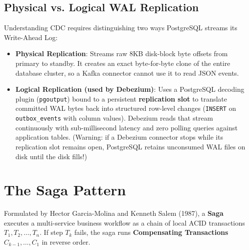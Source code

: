 \subsection{Physical vs. Logical WAL Replication}

Understanding CDC requires distinguishing two ways PostgreSQL streams its Write-Ahead Log:
\begin{itemize}[leftmargin=18pt]
  \item \textbf{Physical Replication}: Streams raw 8KB disk-block byte offsets from primary to standby. It creates an exact byte-for-byte clone of the entire database cluster, so a Kafka connector cannot use it to read JSON events.
  \item \textbf{Logical Replication (used by Debezium)}: Uses a PostgreSQL decoding plugin (\texttt{pgoutput}) bound to a persistent \textbf{replication slot} to translate committed WAL bytes back into structured row-level changes (\texttt{INSERT} on \texttt{outbox\_events} with column values). Debezium reads that stream continuously with sub-millisecond latency and zero polling queries against application tables. (Warning: if a Debezium connector stops while its replication slot remains open, PostgreSQL retains unconsumed WAL files on disk until the disk fills!)
\end{itemize}

\section{The Saga Pattern}

Formulated by Hector Garcia-Molina and Kenneth Salem (1987), a \textbf{Saga} executes a multi-service business workflow as a chain of local ACID transactions $T_1, T_2, \dots, T_n$. If step $T_k$ fails, the saga runs \textbf{Compensating Transactions} $C_{k-1}, \dots, C_1$ in reverse order.

